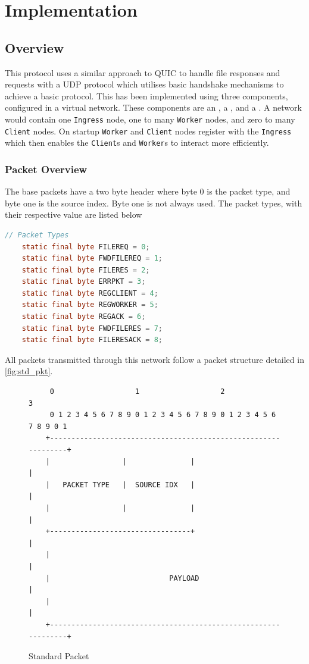 \documentclass{article}
\newcommand{\code}[1]{\texttt{#1}}
\begin{document}
\section{Implementation}
\subsection{Overview}
This protocol uses a similar approach to QUIC to handle file responses and requests with a UDP protocol which utilises basic handshake mechanisms to achieve a basic protocol. This has been implemented using three components, configured in a virtual network. These components are an \code{}, a \code{}, and a \code{}. A network would contain one \code{Ingress} node, one to many \code{Worker} nodes, and zero to many \code{Client} nodes. On startup \code{Worker} and \code{Client} nodes register with the \code{Ingress} which then enables the \code{Client}s and \code{Worker}s to interact more efficiently.
\subsubsection[Packet]{Packet Overview}

The base packets have a two byte header where byte 0 is the packet type, and byte one is the source index. Byte one is not always used. The packet types, with their respective value are listed below
\begin{lstlisting}[language=java,caption={[Encoded Packet Types]Code snippet from \code{Node} with the encoded packet types},label={lst:packet_types}]
    // Packet Types
    static final byte FILEREQ = 0;
    static final byte FWDFILEREQ = 1;
    static final byte FILERES = 2;
    static final byte ERRPKT = 3;
    static final byte REGCLIENT = 4;
    static final byte REGWORKER = 5;
    static final byte REGACK = 6;
    static final byte FWDFILERES = 7;
    static final byte FILERESACK = 8;
\end{lstlisting}

All packets transmitted through this network follow a packet structure detailed in \autoref{fig:std_pkt}.
\begin{figure}[!ht]
	\centering
	\begin{BVerbatim}
	 0                   1                   2                   3  
	 0 1 2 3 4 5 6 7 8 9 0 1 2 3 4 5 6 7 8 9 0 1 2 3 4 5 6 7 8 9 0 1
	+---------------------------------------------------------------+
	|                 |               |                             |
	|   PACKET TYPE   |  SOURCE IDX   |                             |
	|                 |               |                             |
	+---------------------------------+                             |
	|                                                               |
	|                            PAYLOAD                            |
	|                                                               |
	+---------------------------------------------------------------+
	\end{BVerbatim}
	\caption{Standard Packet}
	\label{fig:std_pkt}
\end{figure}
\end{document}
